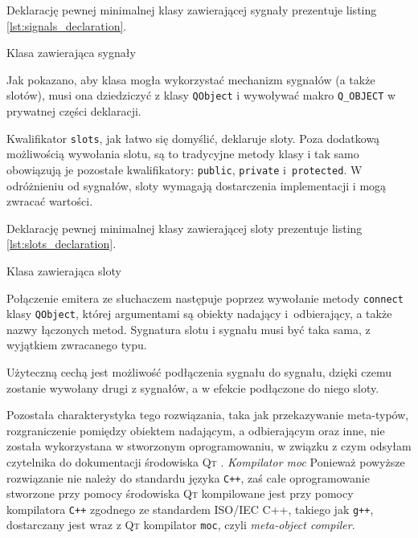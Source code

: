 Deklarację pewnej minimalnej klasy zawierającej sygnały prezentuje listing \ref{lst:signals_declaration}.

\begin{listing}
  
  \caption{Klasa zawierająca sygnały}
  \label{lst:signals_declaration}
\end{listing}

Jak pokazano, aby klasa mogła wykorzystać mechanizm sygnałów (a także slotów), musi ona dziedziczyć z klasy \verb|QObject| i wywoływać makro \verb|Q_OBJECT| w prywatnej części deklaracji.

Kwalifikator \verb|slots|, jak łatwo się domyślić, deklaruje sloty.
Poza dodatkową możliwością wywołania slotu, są to tradycyjne metody klasy i tak samo obowiązują je pozostałe kwalifikatory: \verb|public|, \verb|private| i~\verb|protected|.
W odróżnieniu od sygnałów, sloty wymagają dostarczenia implementacji i mogą zwracać wartości.

Deklarację pewnej minimalnej klasy zawierającej sloty prezentuje listing \ref{lst:slots_declaration}.

\begin{listing}
  
  \caption{Klasa zawierająca sloty}
  \label{lst:slots_declaration}
\end{listing}

Połączenie emitera ze słuchaczem następuje poprzez wywołanie metody \verb|connect| klasy \verb|QObject|, której argumentami są obiekty nadający i~odbierający, a także nazwy łączonych metod.
Sygnatura slotu i sygnału musi być taka sama, z wyjątkiem zwracanego typu.

Użyteczną cechą jest możliwość podłączenia sygnału do sygnału, dzięki czemu zostanie wywołany drugi z sygnałów, a w efekcie podłączone do niego sloty.

Pozostała charakterystyka tego rozwiązania, taka jak przekazywanie meta-typów, rozgraniczenie pomiędzy obiektem nadającym, a odbierającym oraz inne, nie została wykorzystana w stworzonym oprogramowaniu, w związku z czym odsyłam czytelnika do dokumentacji środowiska \textsc{Qt} \citep{Qt}.
\newline
\newline
\textsl{Kompilator moc} Ponieważ powyższe rozwiązanie nie należy do standardu języka \verb|C++|, zaś całe oprogramowanie stworzone przy pomocy środowiska \textsc{Qt} kompilowane jest przy pomocy kompilatora \verb|C++| zgodnego ze standardem ISO/IEC C++\citep{CPPStandard}, takiego jak \texttt{g++}, dostarczany jest wraz z \textsc{Qt} kompilator \texttt{moc}, czyli \textsl{meta-object compiler}.

